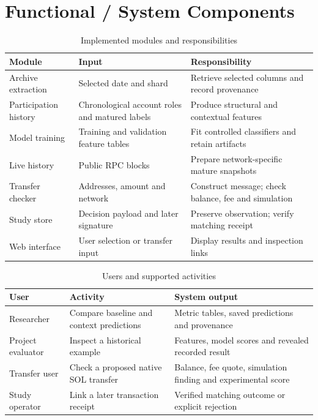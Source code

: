 \documentclass[12pt,a4paper,oneside]{report}
\begin{document}
\section{Functional / System Components}
\begin{table}[H]\centering\caption{Implemented modules and responsibilities}
\small\begin{tabularx}{\textwidth}{p{36mm}YY}\toprule Module&Input&Responsibility\\\midrule
Archive extraction&Selected date and shard&Retrieve selected columns and record provenance\\
Participation history&Chronological account roles and matured labels&Produce structural and contextual features\\
Model training&Training and validation feature tables&Fit controlled classifiers and retain artifacts\\
Live history&Public RPC blocks&Prepare network-specific mature snapshots\\
Transfer checker&Addresses, amount and network&Construct message; check balance, fee and simulation\\
Study store&Decision payload and later signature&Preserve observation; verify matching receipt\\
Web interface&User selection or transfer input&Display results and inspection links\\\bottomrule\end{tabularx}\end{table}

\begin{table}[H]\centering\caption{Users and supported activities}
\begin{tabularx}{\textwidth}{p{29mm}YY}\toprule User&Activity&System output\\\midrule
Researcher&Compare baseline and context predictions&Metric tables, saved predictions and provenance\\
Project evaluator&Inspect a historical example&Features, model scores and revealed recorded result\\
Transfer user&Check a proposed native SOL transfer&Balance, fee quote, simulation finding and experimental score\\
Study operator&Link a later transaction receipt&Verified matching outcome or explicit rejection\\\bottomrule\end{tabularx}\end{table}
\end{document}
